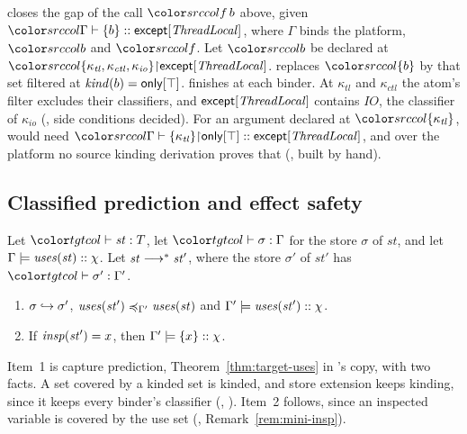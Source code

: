\begin{example}\label{ex:cl-future}
 closes the gap of the call $\src{f\,b}$ above, given $\kindsj{\Gamma}{\cset{b}}{\kexcept{\mathit{ThreadLocal}}}$, where $\Gamma$ binds the platform, $\src{b}$ and $\src{f}$. Let $\src{b}$ be declared at $\src{\restr{\cset{\kappa_{\mathit{tl}}, \kappa_{\mathit{ctl}}, \kappa_{\mathit{io}}}}{\kexcept{\mathit{ThreadLocal}}}}$.  replaces $\src{\cset{b}}$ by that set filtered at $\kindof{b} = \konly{\top}$.  finishes at each binder. At $\kappa_{\mathit{tl}}$ and $\kappa_{\mathit{ctl}}$ the atom's filter excludes their classifiers, and $\kexcept{\mathit{ThreadLocal}}$ contains $\mathit{IO}$, the classifier of $\kappa_{\mathit{io}}$ (, side conditions decided). For an argument declared at $\src{\cset{\kappa_{\mathit{tl}}}}$,  would need $\kindsj{\Gamma}{\restr{\cset{\kappa_{\mathit{tl}}}}{\konly{\top}}}{\kexcept{\mathit{ThreadLocal}}}$, and over the platform no source kinding derivation proves that (, built by hand).
\end{example}

\subsection{Classified prediction and effect safety}\label{sec:cl-runtime}

\begin{theorem}\label{thm:cl-effect}
Let $\statej{\mathit{st}}{T}$, let $\storej{\sigma}{\Gamma}$ for the store $\sigma$ of $\mathit{st}$, and let $\kindle{\Gamma}{\uses{\mathit{st}}}{\chi}$. Let $\mathit{st} \steps \mathit{st}'$, where the store $\sigma'$ of $\mathit{st}'$ has $\storej{\sigma'}{\Gamma'}$.
\begin{enumerate}
\item $\sext{\sigma}{\sigma'}$, $\caple{\Gamma'}{\uses{\mathit{st}'}}{\uses{\mathit{st}}}$ and $\kindle{\Gamma'}{\uses{\mathit{st}'}}{\chi}$.
\item If $\insp{\mathit{st}'} = x$, then $\kindle{\Gamma'}{\cset{x}}{\chi}$.
\end{enumerate}
\end{theorem}

Item~1 is capture prediction, Theorem~\ref{thm:target-uses} in \treeCL's copy, with two facts. A set covered by a kinded set is kinded, and store extension keeps kinding, since it keeps every binder's classifier (, ). Item~2 follows, since an inspected variable is covered by the use set (, Remark~\ref{rem:mini-insp}).

